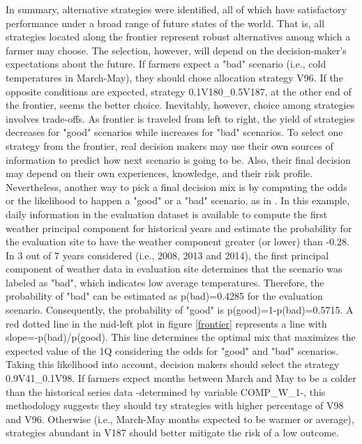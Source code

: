 \documentclass[syngen,nonblindrev]{informs3-syngen}
\begin{document}
In summary, alternative strategies were identified, all of which have satisfactory performance under a broad range of future states of the world. 
That is, all strategies located along the frontier represent robust alternatives among which a farmer may choose. 
The selection, however, will depend on the decision-maker’s expectations about the future. 
If farmers expect a "bad" scenario (i.e., cold temperatures in March-May), they should chose allocation strategy V96. 
If the opposite conditions are expected, strategy 0.1V180\_0.5V187, at the other end of the frontier, seems the better choice. 
Inevitably, however, choice among strategies involves trade-offs. 
As frontier is traveled from left to right, the yield of strategies decreases for "good" scenarios while increases for "bad" scenarios. 
To select one strategy from the frontier, real decision makers may use their own sources of information to predict how next scenario is going to be. 
Also, their final decision may depend on their own experiences, knowledge, and their risk profile. 
Nevertheless, another way to pick a final decision mix is by computing the odds or the likelihood to happen a "good" or a "bad" scenario, as in \cite {lempert2006general}. 
In this example, daily information in the evaluation dataset is available to compute the first weather principal component for historical years and estimate the probability for the evaluation site to have the weather component greater (or lower) than -0.28. 
In 3 out of 7 years considered (i.e., 2008, 2013 and 2014), the first principal component of weather data in evaluation site determines that the scenario was labeled as "bad", which indicates low average temperatures. 
Therefore, the probability of "bad" can be estimated as p(bad)=0.4285 for the evaluation scenario. 
Consequently, the probability of "good" is p(good)=1-p(bad)=0.5715. 
A red dotted line in the mid-left plot in figure \ref{frontier} represents a line with slope=-p(bad)/p(good). 
This line determines the optimal mix that maximizes the expected value of the 1Q considering the odds for "good" and "bad" scenarios. 
Taking this likelihood into account, decision makers should select the strategy 0.9V41\_0.1V98. 
If farmers expect months between March and May to be a colder than the historical series data -determined by variable COMP\_W\_1-, this methodology suggests they should try strategies with higher percentage of V98 and V96. 
Otherwise (i.e., March-May months expected to be warmer or average), strategies abundant in V187 should better mitigate the risk of a low outcome.
\end{document}
